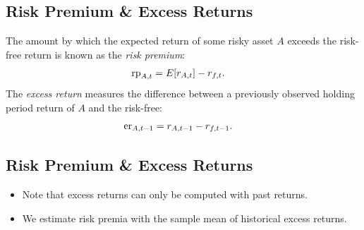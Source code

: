 \documentclass[letterpaper,10pt,english]{sphinxmanual}
\begin{document}
\subsection{Risk Premium \& Excess Returns}
\label{risk:risk-premium-excess-returns}
The amount by which the expected return of some risky asset $A$
exceeds the risk-free return is known as the \emph{risk premium}:
\begin{gather}
\begin{split}\text{rp}_{A,t} & = E[r_{A,t}] - r_{f,t}.\end{split}\notag
\end{gather}
The \emph{excess return} measures the difference between a previously
observed holding period return of $A$ and the risk-free:
\begin{gather}
\begin{split}\text{er}_{A,t-1} & = r_{A,t-1} - r_{f,t-1}.\end{split}\notag
\end{gather}

\subsection{Risk Premium \& Excess Returns}
\label{risk:id2}\begin{itemize}
\item {} 
Note that excess returns can only be computed with past returns.

\end{itemize}
\begin{itemize}
\item {} 
We estimate risk premia with the sample mean of historical excess
returns.

\end{itemize}
\end{document}
